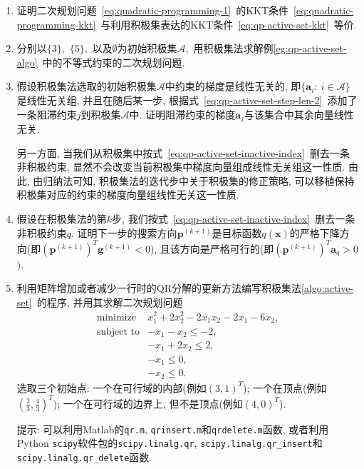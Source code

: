 \documentclass{SBCbookchapter}
\newcommand{\V}[1]{{\bm{#1}}}
\numberwithin{equation}{section}
\begin{document}
\begin{enumerate}
\item 证明二次规划问题~\eqref{eq:quadratic-programming-1}~的KKT条件~\eqref{eq:quadratic-programming-kkt}~与利用积极集表达的KKT条件~\eqref{eq:qp-active-set-kkt}~等价.

\item 分别以$\{3\},$ $\{5\},$ 以及$\emptyset$为初始积极集$\mathcal{A},$ 用积极集法求解例\ref{eg:qp-active-set-algo}~中的不等式约束的二次规划问题.

\item 假设积极集法选取的初始积极集$\mathcal{A}$中约束的梯度是线性无关的, 即$\{ \V{a}_i: ~ i \in \mathcal{A} \}$是线性无关组, 并且在随后某一步, 根据式~\eqref{eq:qp-active-set-step-len-2}~添加了一条阻滞约束$j$到积极集$\mathcal{A}$中. 证明阻滞约束的梯度$\V{a}_j$与该集合中其余向量线性无关.

另一方面, 当我们从积极集中按式~\eqref{eq:qp-active-set-inactive-index}~删去一条非积极约束, 显然不会改变当前积极集中梯度向量组成线性无关组这一性质. 由此, 由归纳法可知, 积极集法的迭代步中关于积极集的修正策略, 可以移植保持积极集对应的约束的梯度向量组线性无关这一性质.

\item 假设在积极集法的第$k$步, 我们按式~\eqref{eq:qp-active-set-inactive-index}~删去一条非积极约束$q.$ 证明下一步的搜索方向$\V{p}^{(k+1)}$是目标函数$q(\V{x})$的严格下降方向(即$\left( \V{p}^{(k+1)} \right)^T \V{g}^{(k+1)} < 0$), 且该方向是严格可行的(即$\left( \V{p}^{(k+1)} \right)^T \V{a}_q > 0$).

\item 利用矩阵增加或者减少一行时的QR分解的更新方法编写积极集法\ref{algo:active-set}~的程序, 并用其求解二次规划问题
\begin{equation*}
\begin{array}{cl}
\text{minimize} & x_1^2 + 2x_2^2 -2x_1x_2 - 2x_1 - 6x_2, \\
\text{subject to} & -x_1 - x_2 \leqslant -2, \\
& -x_1 + 2x_2 \leqslant 2, \\
& -x_1 \leqslant 0,\\
& -x_2 \leqslant 0.
\end{array}
\end{equation*}
选取三个初始点: 一个在可行域的内部(例如$(3, 1)^T$); 一个在顶点(例如$(\frac{2}{3}, \frac{4}{3})^T$); 一个在可行域的边界上, 但不是顶点(例如$(4, 0)^T$).

提示: 可以利用Matlab的\texttt{qr.m}, \texttt{qrinsert.m}和\texttt{qrdelete.m}函数, 或者利用Python \texttt{scipy}软件包的\texttt{scipy.linalg.qr}, \texttt{scipy.linalg.qr\_insert}和\texttt{scipy.linalg.qr\_delete}函数.


\end{enumerate}


% 
% 
\printbibliography[heading=bibintoc, title=参考文献]
\end{document}
